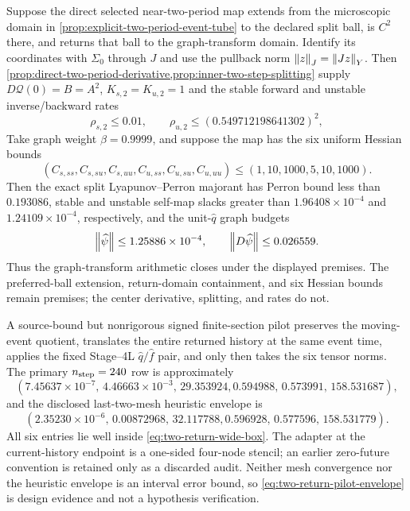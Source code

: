 \begin{proposition}
\label{prop:two-return-graph-arithmetic}
Suppose the direct selected near-two-period map extends from the microscopic
domain in \cref{prop:explicit-two-period-event-tube} to the declared split
ball, is \(C^2\) there, and returns that ball to the graph-transform domain.
Identify its coordinates with \(\Sigma_0\) through \(J\) and use the pullback
norm \(\left\lVert z\right\rVert_J=\left\lVert Jz\right\rVert_Y\).  Then
\cref{prop:direct-two-period-derivative,prop:inner-two-step-splitting} supply
\(D\mathcal Q(0)=B=A^2\),
\(K_{s,2}=K_{u,2}=1\) and the stable forward and unstable inverse/backward
rates
\[
 \rho_{s,2}\le0.01,\qquad
 \rho_{u,2}\le(0.549712198641302)^2,
\]
Take graph weight \(\beta=0.9999\), and suppose the map has the six uniform
Hessian bounds
\begin{equation}
 (C_{s,ss},C_{s,su},C_{s,uu},C_{u,ss},C_{u,su},C_{u,uu})
 \le(1,10,1000,5,10,1000).                            \label{eq:two-return-wide-box}
\end{equation}
Then the exact split Lyapunov--Perron majorant has Perron bound
less than \(0.193086\), stable and unstable self-map slacks greater than
\(1.96408\times10^{-4}\) and \(1.24109\times10^{-4}\), respectively, and
the unit-\(\widehat q\) graph budgets
\begin{equation}
 \left\lVert\widehat\psi\right\rVert\le1.25886\times10^{-4},
 \qquad \left\lVert D\widehat\psi\right\rVert\le0.026559.              \label{eq:two-return-graph-budgets}
\end{equation}
Thus the graph-transform arithmetic closes under the displayed premises.
The preferred-ball extension, return-domain containment, and six Hessian
bounds remain premises; the center derivative, splitting, and rates do not.
\end{proposition}

A source-bound but nonrigorous signed finite-section pilot preserves the
moving-event quotient, translates the entire returned history at the same
event time, applies the fixed Stage--4L \(\widehat q/\widehat f\) pair, and
only then takes the six tensor norms.  The primary
\(n_{\rm step}=240\) row is
approximately
\[
 (7.45637\!\times\!10^{-7},\,4.46663\!\times\!10^{-3},\,29.353924,
   0.594988,\,0.573991,\,158.531687),
\]
and the disclosed last-two-mesh heuristic envelope is
\begin{equation}
 (2.35230\!\times\!10^{-6},\,0.00872968,\,32.117788,
   0.596928,\,0.577596,\,158.531779).                  \label{eq:two-return-pilot-envelope}
\end{equation}
All six entries lie well inside \cref{eq:two-return-wide-box}.  The adapter
at the current-history endpoint is a one-sided four-node stencil; an earlier
zero-future convention is retained only as a discarded audit.  Neither mesh
convergence nor the heuristic envelope is an interval error bound, so
\cref{eq:two-return-pilot-envelope} is design evidence and not a hypothesis
verification.

